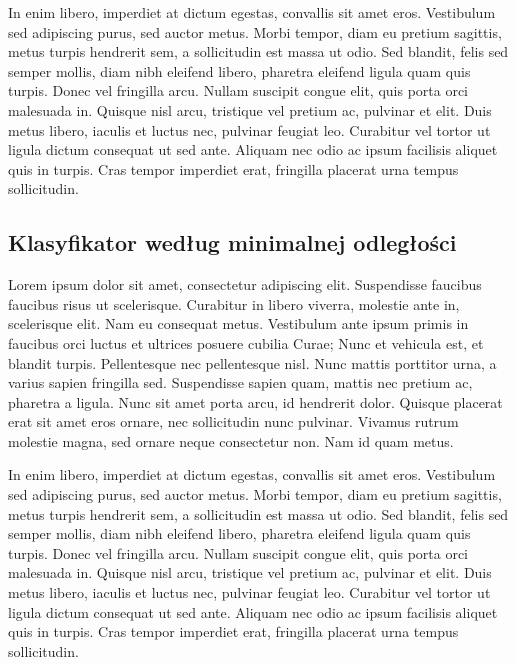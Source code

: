 	In enim libero, imperdiet at dictum egestas, convallis sit amet eros. Vestibulum sed adipiscing purus, sed auctor metus. Morbi tempor, diam eu pretium sagittis, metus turpis hendrerit sem, a sollicitudin est massa ut odio. Sed blandit, felis sed semper mollis, diam nibh eleifend libero, pharetra eleifend ligula quam quis turpis. Donec vel fringilla arcu. Nullam suscipit congue elit, quis porta orci malesuada in. Quisque nisl arcu, tristique vel pretium ac, pulvinar et elit. Duis metus libero, iaculis et luctus nec, pulvinar feugiat leo. Curabitur vel tortor ut ligula dictum consequat ut sed ante. Aliquam nec odio ac ipsum facilisis aliquet quis in turpis. Cras tempor imperdiet erat, fringilla placerat urna tempus sollicitudin.
	
	\subsection{Klasyfikator według minimalnej odległości}
	Lorem ipsum dolor sit amet, consectetur adipiscing elit. Suspendisse faucibus faucibus risus ut scelerisque. Curabitur in libero viverra, molestie ante in, scelerisque elit. Nam eu consequat metus. Vestibulum ante ipsum primis in faucibus orci luctus et ultrices posuere cubilia Curae; Nunc et vehicula est, et blandit turpis. Pellentesque nec pellentesque nisl. Nunc mattis porttitor urna, a varius sapien fringilla sed. Suspendisse sapien quam, mattis nec pretium ac, pharetra a ligula. Nunc sit amet porta arcu, id hendrerit dolor. Quisque placerat erat sit amet eros ornare, nec sollicitudin nunc pulvinar. Vivamus rutrum molestie magna, sed ornare neque consectetur non. Nam id quam metus.

	In enim libero, imperdiet at dictum egestas, convallis sit amet eros. Vestibulum sed adipiscing purus, sed auctor metus. Morbi tempor, diam eu pretium sagittis, metus turpis hendrerit sem, a sollicitudin est massa ut odio. Sed blandit, felis sed semper mollis, diam nibh eleifend libero, pharetra eleifend ligula quam quis turpis. Donec vel fringilla arcu. Nullam suscipit congue elit, quis porta orci malesuada in. Quisque nisl arcu, tristique vel pretium ac, pulvinar et elit. Duis metus libero, iaculis et luctus nec, pulvinar feugiat leo. Curabitur vel tortor ut ligula dictum consequat ut sed ante. Aliquam nec odio ac ipsum facilisis aliquet quis in turpis. Cras tempor imperdiet erat, fringilla placerat urna tempus sollicitudin.
	
